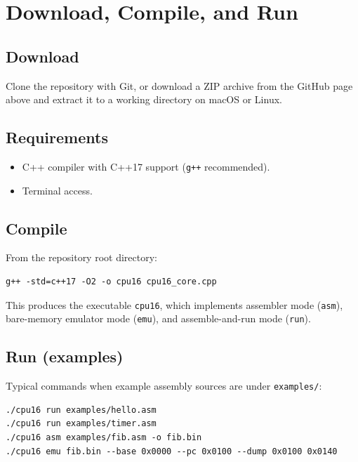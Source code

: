 \documentclass[12pt]{article}
\begin{document}
\section*{Download, Compile, and Run}

\subsection*{Download}

\noindent
Clone the repository with Git, or download a ZIP archive from the GitHub page above and extract it to a working directory on macOS or Linux.

\subsection*{Requirements}

\begin{itemize}
  \item C++ compiler with C++17 support (\texttt{g++} recommended).
  \item Terminal access.
\end{itemize}

\subsection*{Compile}

\noindent
From the repository root directory:

\begin{verbatim}
g++ -std=c++17 -O2 -o cpu16 cpu16_core.cpp
\end{verbatim}

\noindent
This produces the executable \texttt{cpu16}, which implements assembler mode (\texttt{asm}), bare-memory emulator mode (\texttt{emu}), and assemble-and-run mode (\texttt{run}).

\subsection*{Run (examples)}

\noindent
Typical commands when example assembly sources are under \texttt{examples/}:

\begin{verbatim}
./cpu16 run examples/hello.asm
./cpu16 run examples/timer.asm
./cpu16 asm examples/fib.asm -o fib.bin
./cpu16 emu fib.bin --base 0x0000 --pc 0x0100 --dump 0x0100 0x0140
\end{verbatim}
\end{document}
